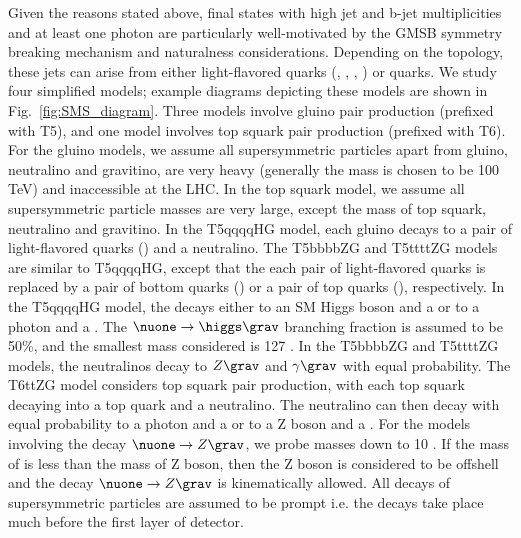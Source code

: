 Given the reasons stated above, final states with high jet and b-jet multiplicities and at least one photon
are particularly well-motivated by the GMSB symmetry breaking mechanism and naturalness considerations.
Depending on the topology, these jets can arise from either light-flavored quarks (\cPqu, \cPqd, \cPqs, \cPqc) or {\cPqb} quarks. We study 
four simplified models; example diagrams depicting these models are shown in Fig.~\ref{fig:SMS_diagram}.
Three models involve gluino pair production (prefixed with T5), and one model involves top squark pair production (prefixed with T6).
For the gluino models, we assume all supersymmetric particles apart from gluino, neutralino and gravitino, are very heavy (generally the 
mass is chosen to be 100 TeV) and inaccessible at the LHC. In the top squark model, we assume all supersymmetric particle masses
are very large, except the mass of top squark, neutralino and gravitino.
In the T5qqqqHG model, each gluino decays to a pair of light-flavored quarks (\qqbar) and a neutralino.  The T5bbbbZG and T5ttttZG models 
are similar to T5qqqqHG, except that the each pair of light-flavored quarks is replaced by a pair of bottom quarks (\bbbar) or a pair of 
top quarks (\ttbar), respectively. In the T5qqqqHG model, the \nuone decays either to an SM Higgs boson and a \grav or to a photon and a 
.  The $\nuone\to\higgs\grav$ branching fraction is assumed to be 50\%, and the smallest \nuone mass considered is 127 \gev. In 
the T5bbbbZG and T5ttttZG models, the neutralinos decay to $Z\grav$ and $\gamma\grav$ with equal probability. The T6ttZG model considers 
top squark pair production, with each top squark decaying into a top quark and a neutralino. The neutralino can then decay with equal 
probability to a photon and a \grav or to a Z boson and a \grav. For the models involving the decay $\nuone\to Z\grav$, we probe \nuone 
masses down to 10 \gev. If the mass of \nuone is less than the mass of Z boson, then the Z boson is considered to be offshell and the decay $\nuone\to Z\grav$ is kinematically allowed. All decays of supersymmetric particles are assumed to be prompt i.e. the decays take place much before the first 
layer of detector. 

